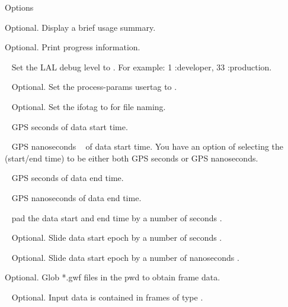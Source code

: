 \begin{entry}
\item[Options]\leavevmode
\begin{entry}
\item[\option{--help}] Optional. Display a brief usage summary.

\item[\option{--verbose}] Optional. Print progress information.

\item[\option{--debug-level}~\parm{LEVEL}] Set the LAL debug level to 
. For example: 1 :developer, 33 :production.

\item[\option{user-tag}~\parm{STRING}] Optional. Set the process-params 
usertag to .

\item[\option{--ifo-tag}~\parm{STRING}] Optional. Set the ifotag to 
 for file naming.

\item[\option{--gps-start-time}~\parm{SEC}] GPS seconds  of data 
start time.

\item[\option{--gps-start-time-ns}~\parm{NS}] GPS nanoseconds ~ of 
data start time. You have an option of selecting the (start/end time) to be either both 
GPS seconds or GPS nanoseconds.

\item[\option{--gps-end-time}~\parm{SEC}] GPS seconds  of data end 
time.

\item[\option{--gps-end-time-ns}~\parm{NS}] GPS nanoseconds  
of data end time.

\item[\option{--pad-data}~\parm{SEC}] pad the data start and end time 
by a number of seconds .

\item[\option{--slide-time}~\parm{SEC}] Optional. Slide data start epoch by 
a number of seconds .

\item[\option{--slide-time-ns}~\parm{NS}] Optional. Slide data start epoch 
by a number of nanoseconds .

\item[\option{--glob-frame-data}] Optional. Glob *.gwf files in the pwd to 
obtain frame data.

\item[\option{--frame-type}~\parm{TAG}] Optional. Input data is contained in 
frames of type .


\end{entry}
\end{entry}
